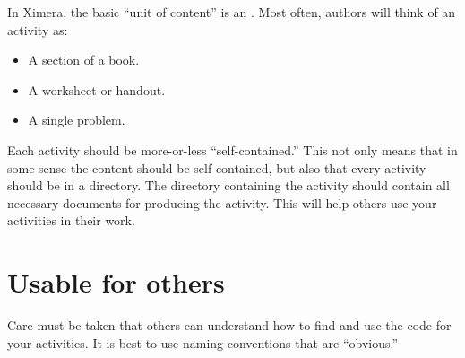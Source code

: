 \documentclass{ximera}
\begin{document}
In Ximera, the basic ``unit of content'' is an . Most
often, authors will think of an activity as:
\begin{itemize}
\item A section of a book.
\item A worksheet or handout.
\item A single problem.
\end{itemize}
Each activity should be more-or-less ``self-contained.'' This not only
means that in some sense the content should be self-contained, but
also that every activity should be in a directory. The directory
containing the activity should contain all necessary documents for
producing the activity.  This will help others use your activities in
their work.


\section{Usable for others}

Care must be taken that others can understand how to find and use the
code for your activities. It is best to use naming conventions that
are ``obvious.'' 
\end{document}
